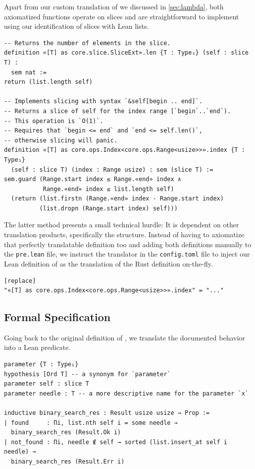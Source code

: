 Apart from our custom translation of  we discussed in
\autoref{sec:lambda}, both axiomatized functions operate on slices and are straightforward to
implement using our identification of slices with Lean lists.

\begin{verbatim}
-- Returns the number of elements in the slice.
definition «[T] as core.slice.SliceExt».len {T : Type₁} (self : slice T) :
  sem nat :=
return (list.length self)

-- Implements slicing with syntax `&self[begin .. end]`.
-- Returns a slice of self for the index range [`begin`..`end`).
-- This operation is `O(1)`.
-- Requires that `begin <= end` and `end <= self.len()`,
-- otherwise slicing will panic.
definition «[T] as core.ops.Index<core.ops.Range<usize>>».index {T : Type₁}
  (self : slice T) (index : Range usize) : sem (slice T) :=
sem.guard (Range.start index ≤ Range.«end» index ∧
           Range.«end» index ≤ list.length self)
  (return (list.firstn (Range.«end» index - Range.start index)
          (list.dropn (Range.start index) self)))
\end{verbatim}

The latter method presents a
small technical hurdle: It is dependent on other translation products,
specifically the  structure. Instead of having to axiomatize that
perfectly translatable definition too and adding both definitions manually to the
\verb!pre.lean! file, we instruct the translator in the \verb!config.toml! file to inject our
Lean definition of  as the translation of the Rust definition on-the-fly.

\begin{verbatim}
[replace]
"«[T] as core.ops.Index<core.ops.Range<usize>>».index" = "..."
\end{verbatim}

\subsection{Formal Specification}

Going back to the original definition of , we translate
the documented behavior into a Lean predicate.

\begin{verbatim}
parameter {T : Type₁}
hypothesis [Ord T] -- a synonym for `parameter`
parameter self : slice T
parameter needle : T -- a more descriptive name for the parameter `x`

inductive binary_search_res : Result usize usize → Prop :=
| found     : Πi, list.nth self i = some needle →
  binary_search_res (Result.Ok i)
| not_found : Πi, needle ∉ self → sorted (list.insert_at self i needle) →
  binary_search_res (Result.Err i)
\end{verbatim}

